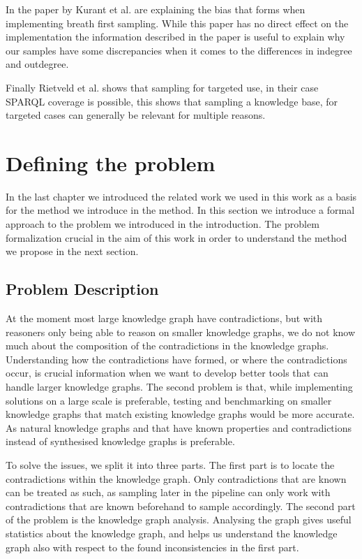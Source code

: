 \documentclass[11pt,letterpaper ,oneside ]{book}
\begin{document}
In the paper by Kurant et al.\cite{Kurant:2011}  are explaining the bias that forms when implementing breath first sampling.
While this paper has no direct effect on the implementation the information described in the paper is useful to explain why our samples have some discrepancies when it comes to the differences in indegree and outdegree. 

Finally Rietveld et al.\cite{Rietveld:2014} shows that sampling for targeted use, in their case SPARQL coverage is possible, this shows that sampling a knowledge base, for targeted cases can generally be relevant for multiple reasons.

\newpage

\chapter{Defining the problem}\label{ProblemDefintion}
In the last chapter we introduced the related work we used in this work as a basis for the method we introduce in the method. In this section we introduce a formal approach to the problem we introduced in the introduction. The problem formalization crucial in the aim of this work in order to understand the method we propose in the next section.

\section{Problem Description}
At the moment most large knowledge graph have contradictions, but with reasoners only being able to reason on smaller knowledge graphs, we do not know much about the composition of the contradictions in the knowledge graphs. Understanding how the contradictions have formed, or where the contradictions occur, is crucial information when we want to develop better tools that can handle larger knowledge graphs. The second problem is that, while implementing solutions on a large scale is preferable, testing and benchmarking on smaller knowledge graphs that match existing knowledge graphs would be more accurate. As natural knowledge graphs and that have known properties and contradictions instead of synthesised knowledge graphs is preferable. 

To solve the issues, we split it into three parts. The first part is to locate the contradictions within the knowledge graph. Only contradictions that are known can be treated as such, as sampling later in the pipeline can only work with contradictions that are known beforehand to sample accordingly.
The second part of the problem is the knowledge graph analysis. Analysing the graph gives useful statistics about the knowledge graph, and helps us understand the knowledge graph also with respect to the found inconsistencies in the first part.
\end{document}
